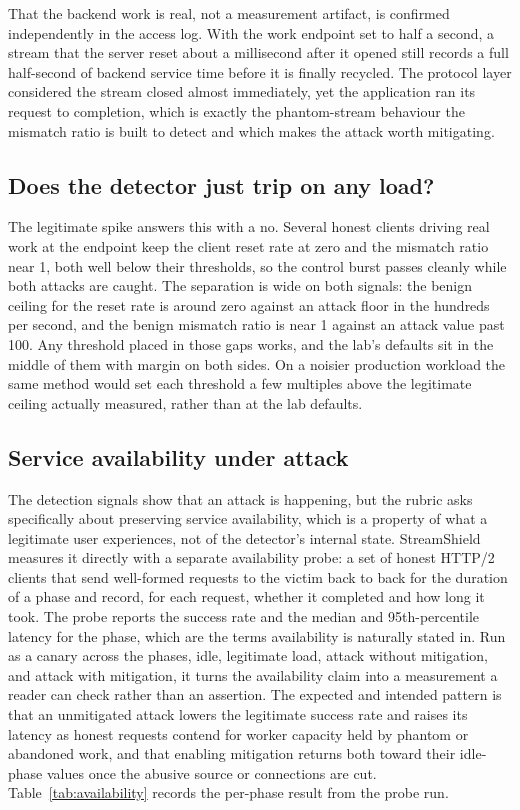 \documentclass[a4paper,fleqn]{cas-dc}
\begin{document}
That the backend work is real, not a measurement artifact, is confirmed independently in the access log. With the work endpoint set to half a second, a stream that the server reset about a millisecond after it opened still records a full half-second of backend service time before it is finally recycled. The protocol layer considered the stream closed almost immediately, yet the application ran its request to completion, which is exactly the phantom-stream behaviour the mismatch ratio is built to detect and which makes the attack worth mitigating.

\subsection{Does the detector just trip on any load?}\label{sec:eval-control}

The legitimate spike answers this with a no. Several honest clients driving real work at the endpoint keep the client reset rate at zero and the mismatch ratio near 1, both well below their thresholds, so the control burst passes cleanly while both attacks are caught. The separation is wide on both signals: the benign ceiling for the reset rate is around zero against an attack floor in the hundreds per second, and the benign mismatch ratio is near 1 against an attack value past 100. Any threshold placed in those gaps works, and the lab's defaults sit in the middle of them with margin on both sides. On a noisier production workload the same method would set each threshold a few multiples above the legitimate ceiling actually measured, rather than at the lab defaults.

\subsection{Service availability under attack}\label{sec:eval-availability}

The detection signals show that an attack is happening, but the rubric asks specifically about preserving service availability, which is a property of what a legitimate user experiences, not of the detector's internal state. StreamShield measures it directly with a separate availability probe: a set of honest HTTP/2 clients that send well-formed requests to the victim back to back for the duration of a phase and record, for each request, whether it completed and how long it took. The probe reports the success rate and the median and 95th-percentile latency for the phase, which are the terms availability is naturally stated in. Run as a canary across the phases, idle, legitimate load, attack without mitigation, and attack with mitigation, it turns the availability claim into a measurement a reader can check rather than an assertion. The expected and intended pattern is that an unmitigated attack lowers the legitimate success rate and raises its latency as honest requests contend for worker capacity held by phantom or abandoned work, and that enabling mitigation returns both toward their idle-phase values once the abusive source or connections are cut. Table~\ref{tab:availability} records the per-phase result from the probe run.
\end{document}
